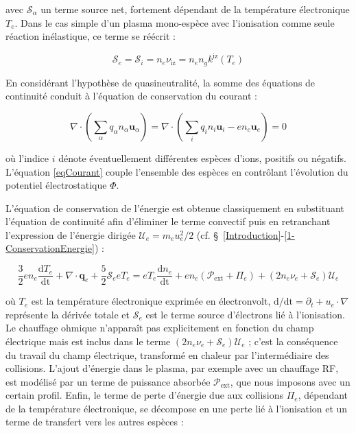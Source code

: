\begin{refsection}
avec $\mathcal{S}_\alpha$ un terme source net, fortement dépendant de la
température électronique $T_e$. Dans le cas simple d'un plasma mono-espèce avec
l'ionisation comme seule réaction inélastique, ce terme se réécrit :

\begin{equation}
\mathcal S_e=\mathcal
S_i=n_e\nu_\text{iz}=n_en_gk^\text{iz}(T_e) 
\end{equation}

En considérant l'hypothèse de quasineutralité, la
somme des équations de continuité conduit à l'équation de conservation du courant :

\begin{equation}
\label{eqCourant}
\nabla\cdot(\sum_\alpha q_\alpha n_\alpha\mathbf
u_\alpha)=\nabla\cdot(\sum_iq_in_i\mathbf{u}_i-en_e\mathbf{u}_e)=0
\end{equation}

où l'indice $i$ dénote éventuellement différentes espèces d'ions, positifs ou
négatifs.
L'équation \eqref{eqCourant} couple l'ensemble des espèces en contrôlant
l'évolution du potentiel électrostatique $\Phi$.

L'équation de conservation de l'énergie est obtenue classiquement en substituant
l'équation de continuité afin d'éliminer le terme convectif puis en retranchant
l'expression de l'énergie dirigée $\mathcal{U}_e=m_eu_e^2/2$ (cf.
\S~\ref{Introduction}-\ref{1-ConservationEnergie}) :

\begin{equation}
\label{3-eqTemperature}
\frac{3}{2}en_e\frac{\text{d}T_e}{\text{dt}}+\nabla\cdot\mathbf
q_e + \frac{5}{2}\mathcal{S}_e eT_e = eT_e\frac{\text{d}n_e}{\text{dt}}+ 
en_e\left(\mathcal{P}_\text{ext}+\Pi_e\right)+(2n_e\nu_e+\mathcal{S}_e)\mathcal{U}_e
\end{equation}

où $T_e$ est la température électronique exprimée en électronvolt,
$\text{d/dt}=\partial_t+u_e\cdot\nabla$ représente la dérivée totale et
$\mathcal{S}_e$ est le terme source d'électrons lié à l'ionisation. 
Le chauffage ohmique n'apparaît pas explicitement en fonction du champ
électrique mais est inclus dans le terme
$(2n_e\nu_e+\mathcal{S}_e)\mathcal{U}_e$ ; c'est la
conséquence du travail du champ électrique, transformé en chaleur par
l'intermédiaire des collisions. L'ajout d'énergie dans le plasma, par exemple
avec un chauffage RF, est modélisé par un terme
de puissance absorbée $\mathcal{P}_\text{ext}$, que nous imposons avec un
certain profil. Enfin, le terme de perte d'énergie due aux collisions $\Pi_e$,
dépendant de la température électronique, se décompose en une perte lié à
l'ionisation et un terme de transfert vers les autres espèces :


\end{refsection}
